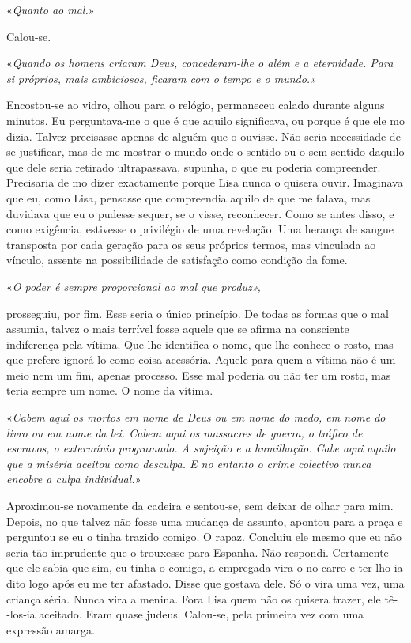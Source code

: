 «\emph{Quanto ao mal.}»

Calou­‑se.

«\emph{Quando os homens criaram Deus, concederam­‑lhe o além e a
eternidade. Para si próprios, mais ambiciosos, ficaram com o tempo e o
mundo.»}

Encostou­‑se ao vidro, olhou para o relógio, permaneceu calado durante
alguns minutos. Eu perguntava­‑me o que é que aquilo significava, ou
porque é que ele mo dizia. Talvez precisasse apenas de alguém que o
ouvisse. Não seria necessidade de se justificar, mas de me mostrar o
mundo onde o sentido ou o sem sentido daquilo que dele seria retirado
ultrapassava, supunha, o que eu poderia compreender. Precisaria de mo
dizer exactamente porque Lisa nunca o quisera ouvir. Imaginava que eu,
como Lisa, pensasse que compreendia aquilo de que me falava, mas
duvidava que eu o pudesse sequer, se o visse, reconhecer. Como se antes
disso, e como exigência, estivesse o privilégio de uma revelação. Uma
herança de sangue transposta por cada geração para os seus próprios
termos, mas vinculada ao vínculo, assente na possibilidade de satisfação
como condição da fome.

«\emph{O poder é sempre proporcional ao mal que produz»,}

prosseguiu, por fim. Esse seria o único princípio. De todas as formas
que o mal assumia, talvez o mais terrível fosse aquele que se afirma na
consciente indiferença pela vítima. Que lhe identifica o nome, que lhe
conhece o rosto, mas que prefere ignorá­‑lo como coisa acessória. Aquele
para quem a vítima não é um meio nem um fim, apenas processo. Esse mal
poderia ou não ter um rosto, mas teria sempre um nome. O nome da vítima.

«\emph{Cabem aqui os mortos em nome de Deus ou em nome do medo, em nome
do livro ou em nome da lei. Cabem aqui os massacres de guerra, o tráfico
de escravos, o extermínio programado. A sujeição e a humilhação. Cabe
aqui aquilo que a miséria aceitou como desculpa. E no entanto o crime
colectivo nunca encobre a culpa individual.}»

Aproximou­‑se novamente da cadeira e sentou­‑se, sem deixar de olhar
para mim. Depois, no que talvez não fosse uma mudança de assunto,
apontou para a praça e perguntou se eu o tinha trazido comigo. O rapaz.
Concluiu ele mesmo que eu não seria tão imprudente que o trouxesse para
Espanha. Não respondi. Certamente que ele sabia que sim, eu tinha­‑o
comigo, a empregada vira­‑o no carro e ter­‑lho­‑ia dito logo após eu me
ter afastado. Disse que gostava dele. Só o vira uma vez, uma criança
séria. Nunca vira a menina. Fora Lisa quem não os quisera trazer, ele
tê­‑los­‑ia aceitado. Eram quase judeus. Calou­‑se, pela primeira vez
com uma expressão amarga.


